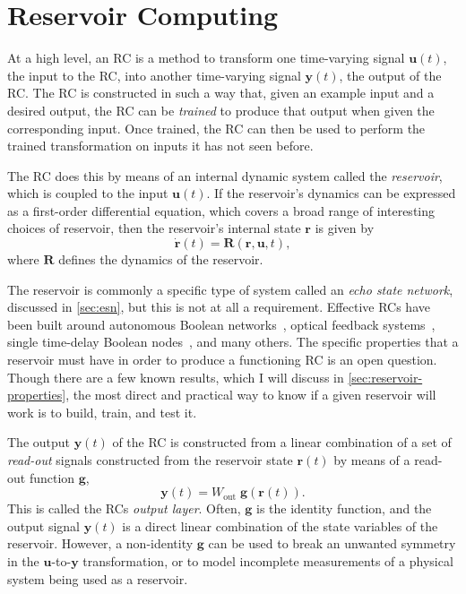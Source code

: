 \chapter{Reservoir Computing}\label{ch:reservoir-computing}

At a high level, an RC is a method to transform one time-varying
signal $\bm{u}(t)$, the input to the RC, into another time-varying
signal $\bm{y}(t)$, the output of the RC. The RC is constructed in
such a way that, given an example input and a desired output, the RC
can be \emph{trained} to produce that output when given the
corresponding input. Once trained, the RC can then be used to perform
the trained transformation on inputs it has not seen before.

The RC does this by means of an internal dynamic system called the
\emph{reservoir}, which is coupled to the input $\bm{u}(t)$. If the
reservoir's dynamics can be expressed as a first-order differential
equation, which covers a broad range of interesting choices of
reservoir, then the reservoir's internal state $\bm{r}$ is given by
\begin{equation}
  \label{eq:reservoir}
  \dot{\mathbf{r}}(t) = \mathbf{R}\left(\mathbf{r}, \mathbf{u}, t\right),
\end{equation}
where $\mathbf{R}$ defines the dynamics of the reservoir.

The reservoir is commonly a specific type of system called an
\emph{echo state network}, discussed in \cref{sec:esn}, but this is
not at all a requirement. Effective RCs have been built around
autonomous Boolean networks~\cite{canaday2018}, optical feedback
systems~\cite{antonik2016}, single time-delay Boolean
nodes~\cite{haynes2015}, and many others. The specific properties that
a reservoir must have in order to produce a functioning RC is an open
question. Though there are a few known results, which I will discuss
in \cref{sec:reservoir-properties}, the most direct and practical way
to know if a given reservoir will work is to build, train, and test
it.

The output $\bm{y}(t)$ of the RC is constructed from a linear
combination of a set of \emph{read-out} signals constructed from the
reservoir state $\bm{r}(t)$ by means of a read-out function $\bm{g}$,
\begin{equation}
  \label{eq:output}
  \bm{y}(t) = W_\text{out}\;\bm{g}\left(\bm{r}(t)\right).
\end{equation}
This is called the RCs \emph{output layer}. Often, $\bm{g}$ is the
identity function, and the output signal $\bm{y}(t)$ is a direct
linear combination of the state variables of the reservoir. However, a
non-identity $\bm{g}$ can be used to break an unwanted symmetry in the
$\bm{u}$-to-$\bm{y}$ transformation, or to model incomplete
measurements of a physical system being used as a reservoir.

